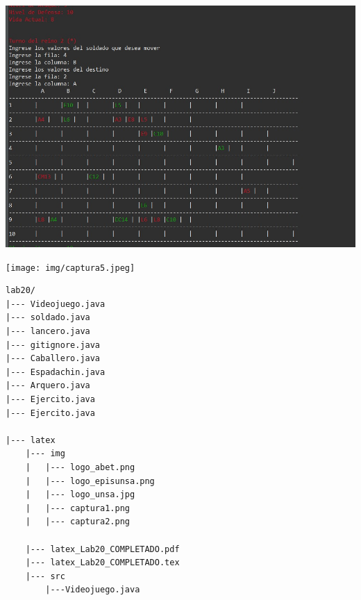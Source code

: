 \documentclass{article}
\begin{document}
\begin{itemize}
	\includegraphics[scale=0.35]{img/captura4.jpeg} 
	

	\texttt{[image: img/captura5.jpeg]} 
	

	\end{itemize}
	
\begin{lstlisting}[style=ascii-tree]
lab20/
|--- Videojuego.java
|--- soldado.java
|--- lancero.java
|--- gitignore.java
|--- Caballero.java
|--- Espadachin.java
|--- Arquero.java
|--- Ejercito.java
|--- Ejercito.java

|--- latex
    |--- img
    |   |--- logo_abet.png
    |   |--- logo_episunsa.png
    |   |--- logo_unsa.jpg
    |   |--- captura1.png    
    |   |--- captura2.png    

    |--- latex_Lab20_COMPLETADO.pdf    
    |--- latex_Lab20_COMPLETADO.tex
    |--- src
        |---Videojuego.java
\end{lstlisting}    













			
\end{document}
